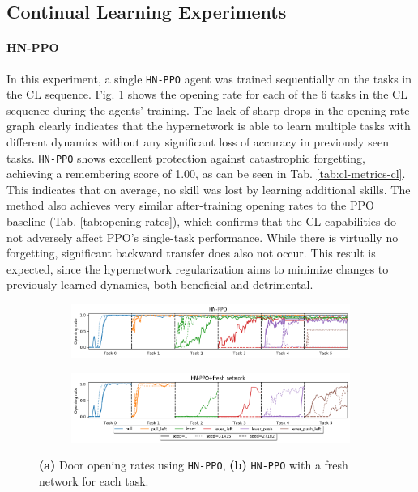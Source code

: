 \documentclass[dvipsnames]{article} %
\newcommand{\comment}[1]{}
\newcommand{\jh}[1] {\comment{{\color{RawSienna} JH: #1}}}           %
\begin{document}
\subsection{Continual Learning Experiments}
\paragraph{HN-PPO}
\label{chap:hnppo}
In this experiment, a single \texttt{HN-PPO} agent was trained sequentially on the tasks in the CL sequence. Fig. \ref{fig:hnppo_graph} shows the opening rate for each of the 6 tasks in the CL sequence during the agents' training. The lack of sharp drops in the opening rate graph clearly indicates that the hypernetwork is able to learn multiple tasks with different dynamics without any significant loss of accuracy in previously seen tasks.  \texttt{HN-PPO} shows excellent protection against catastrophic forgetting, achieving a remembering score of 1.00, as can be seen in Tab. \ref{tab:cl-metrics-cl}. This indicates that on average, no skill was lost by learning additional skills. The method also achieves very similar after-training opening rates to the PPO baseline (Tab. \ref{tab:opening-rates}), which confirms that the CL capabilities do not adversely affect PPO's single-task performance. While there is virtually no forgetting, significant backward transfer does also not occur. This result is expected, since the hypernetwork regularization aims to minimize changes to previously learned dynamics, both beneficial and detrimental.

\begin{figure}[htbp]
\begin{subfigure}{\linewidth}
    \includegraphics[width=1.0\linewidth]{images/cl_timeseries_series5_config.png}
    \caption{}
    \label{fig:hnppo_graph}
\end{subfigure}
\begin{subfigure}{\linewidth}
    \includegraphics[width=1.0\linewidth]{images/cl_timeseries_series6_config.png}
    \caption{}
    \label{fig:hnppo_graph_fresh}
\end{subfigure}
\caption{\textbf{(a)} Door opening rates using \texttt{HN-PPO}, \textbf{(b)} \texttt{HN-PPO} with a fresh network for each task.\jh{the data for this plot (a) are still incomplete, right?}}
\end{figure}
\end{document}
